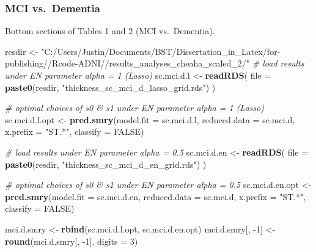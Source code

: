 \documentclass[
]{article}
\newenvironment{Shaded}{\begin{snugshade}}{\end{snugshade}}
\newcommand{\CommentTok}[1]{\textcolor[rgb]{0.56,0.35,0.01}{\textit{#1}}}
\newcommand{\DataTypeTok}[1]{\textcolor[rgb]{0.13,0.29,0.53}{#1}}
\newcommand{\DecValTok}[1]{\textcolor[rgb]{0.00,0.00,0.81}{#1}}
\newcommand{\KeywordTok}[1]{\textcolor[rgb]{0.13,0.29,0.53}{\textbf{#1}}}
\newcommand{\NormalTok}[1]{#1}
\newcommand{\OtherTok}[1]{\textcolor[rgb]{0.56,0.35,0.01}{#1}}
\newcommand{\StringTok}[1]{\textcolor[rgb]{0.31,0.60,0.02}{#1}}
\begin{document}
\hypertarget{mci-vs.-dementia}{%
\subsubsection{MCI vs.~Dementia}\label{mci-vs.-dementia}}

Bottom sections of Tables 1 and 2 (MCI vs.~Dementia).

\begin{Shaded}
\begin{Highlighting}[]
\NormalTok{resdir <-}\StringTok{ "C:/Users/Justin/Documents/BST/Dissertation_in_Latex/for-publishing//Rcode-ADNI//results_analyses_cheaha_scaled_2/"}
\CommentTok{# load results under EN parameter alpha = 1 (Lasso)}
\NormalTok{sc.mci.d.l <-}\StringTok{ }\KeywordTok{readRDS}\NormalTok{(}
  \DataTypeTok{file =} \KeywordTok{paste0}\NormalTok{(resdir, }\StringTok{"thickness_sc_mci_d_lasso_grid.rds"}\NormalTok{)}
\NormalTok{  )}

\CommentTok{# optimal choices of s0 & s1 under EN parameter alpha = 1 (Lasso)}
\NormalTok{sc.mci.d.l.opt <-}\StringTok{ }\KeywordTok{pred.smry}\NormalTok{(}\DataTypeTok{model.fit =}\NormalTok{ sc.mci.d.l,}
                             \DataTypeTok{reduced.data =}\NormalTok{ sc.mci.d,}
                             \DataTypeTok{x.prefix =} \StringTok{"ST.*"}\NormalTok{,}
                            \DataTypeTok{classify =} \OtherTok{FALSE}\NormalTok{)}

\CommentTok{# load results under EN parameter alpha = 0.5}
\NormalTok{sc.mci.d.en <-}\StringTok{ }\KeywordTok{readRDS}\NormalTok{(}
  \DataTypeTok{file =} \KeywordTok{paste0}\NormalTok{(resdir, }\StringTok{"thickness_sc_mci_d_en_grid.rds"}\NormalTok{)}
\NormalTok{  )}

\CommentTok{# optimal choices of s0 & s1 under EN parameter alpha = 0.5}
\NormalTok{sc.mci.d.en.opt <-}\StringTok{ }\KeywordTok{pred.smry}\NormalTok{(}\DataTypeTok{model.fit =}\NormalTok{ sc.mci.d.en,}
                             \DataTypeTok{reduced.data =}\NormalTok{ sc.mci.d,}
                             \DataTypeTok{x.prefix =} \StringTok{"ST.*"}\NormalTok{,}
                             \DataTypeTok{classify =} \OtherTok{FALSE}\NormalTok{)}

\NormalTok{mci.d.smry <-}\StringTok{ }\KeywordTok{rbind}\NormalTok{(sc.mci.d.l.opt,}
\NormalTok{                     sc.mci.d.en.opt)}
\NormalTok{mci.d.smry[, }\DecValTok{-1}\NormalTok{] <-}\StringTok{ }\KeywordTok{round}\NormalTok{(mci.d.smry[, }\DecValTok{-1}\NormalTok{], }\DataTypeTok{digits =} \DecValTok{3}\NormalTok{)}
\end{Highlighting}
\end{Shaded}
\end{document}
